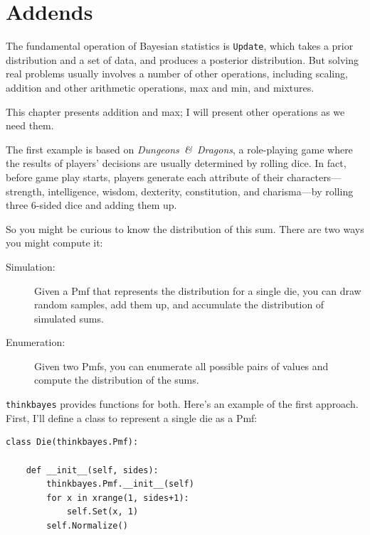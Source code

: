 \documentclass[12pt]{book}
\begin{document}
\section{Addends}
\label{addends}

The fundamental operation of Bayesian statistics is
{\tt Update}, which takes a prior distribution and a set
of data, and produces a posterior distribution.  But solving
real problems usually involves a number of other operations,
including scaling, addition and other arithmetic operations,
max and min, and mixtures.

This chapter presents addition and max; I will present
other operations as we need them.

The first example is based on
{\it Dungeons~\&~Dragons}, a role-playing game where the results
of players' decisions are usually determined by rolling dice.
In fact, before game play starts, players generate each
attribute of their characters---strength, intelligence, wisdom,
dexterity, constitution, and charisma---by rolling three
6-sided dice and adding them up.

So you might be curious to know the distribution of this sum.
There are two ways you might compute it:

\begin{description}

\item[Simulation:] Given a Pmf that represents the distribution
for a single die, you can draw random samples, add them up,
and accumulate the distribution of simulated sums.

\item[Enumeration:] Given two Pmfs, you can enumerate all possible
pairs of values and compute the distribution of the sums.

\end{description}

\verb"thinkbayes" provides functions for both.  Here's an example
of the first approach.  First, I'll define a class to represent
a single die as a Pmf:

\begin{verbatim}
class Die(thinkbayes.Pmf):

    def __init__(self, sides):
        thinkbayes.Pmf.__init__(self)
        for x in xrange(1, sides+1):
            self.Set(x, 1)
        self.Normalize()
\end{verbatim}
\end{document}

